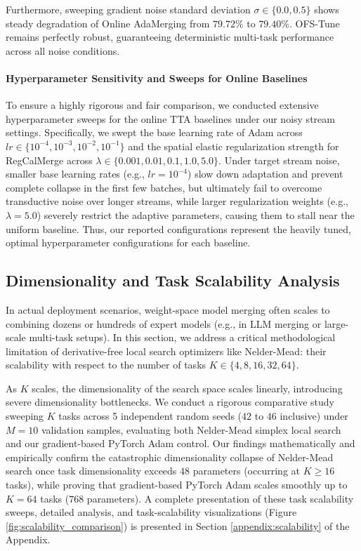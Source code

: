 Furthermore, sweeping gradient noise standard deviation $\sigma \in \{0.0, 0.5\}$ shows steady degradation of Online AdaMerging from $79.72\%$ to $79.40\%$. OFS-Tune remains perfectly robust, guaranteeing deterministic multi-task performance across all noise conditions.

\paragraph{Hyperparameter Sensitivity and Sweeps for Online Baselines}
To ensure a highly rigorous and fair comparison, we conducted extensive hyperparameter sweeps for the online TTA baselines under our noisy stream settings. Specifically, we swept the base learning rate of Adam across $lr \in \{10^{-4}, 10^{-3}, 10^{-2}, 10^{-1}\}$ and the spatial elastic regularization strength for RegCalMerge across $\lambda \in \{0.001, 0.01, 0.1, 1.0, 5.0\}$. Under target stream noise, smaller base learning rates (e.g., $lr = 10^{-4}$) slow down adaptation and prevent complete collapse in the first few batches, but ultimately fail to overcome transductive noise over longer streams, while larger regularization weights (e.g., $\lambda = 5.0$) severely restrict the adaptive parameters, causing them to stall near the uniform baseline. Thus, our reported configurations represent the heavily tuned, optimal hyperparameter configurations for each baseline.

\subsection{Dimensionality and Task Scalability Analysis}
\label{sec:scalability}

In actual deployment scenarios, weight-space model merging often scales to combining dozens or hundreds of expert models (e.g., in LLM merging or large-scale multi-task setups). In this section, we address a critical methodological limitation of derivative-free local search optimizers like Nelder-Mead: their scalability with respect to the number of tasks $K \in \{4, 8, 16, 32, 64\}$. 

As $K$ scales, the dimensionality of the search space scales linearly, introducing severe dimensionality bottlenecks. We conduct a rigorous comparative study sweeping $K$ tasks across 5 independent random seeds ($42$ to $46$ inclusive) under $M=10$ validation samples, evaluating both Nelder-Mead simplex local search and our gradient-based PyTorch Adam control. Our findings mathematically and empirically confirm the catastrophic dimensionality collapse of Nelder-Mead search once task dimensionality exceeds $48$ parameters (occurring at $K \ge 16$ tasks), while proving that gradient-based PyTorch Adam scales smoothly up to $K=64$ tasks ($768$ parameters). A complete presentation of these task scalability sweeps, detailed analysis, and task-scalability visualizations (Figure \ref{fig:scalability_comparison}) is presented in Section \ref{appendix:scalability} of the Appendix.

